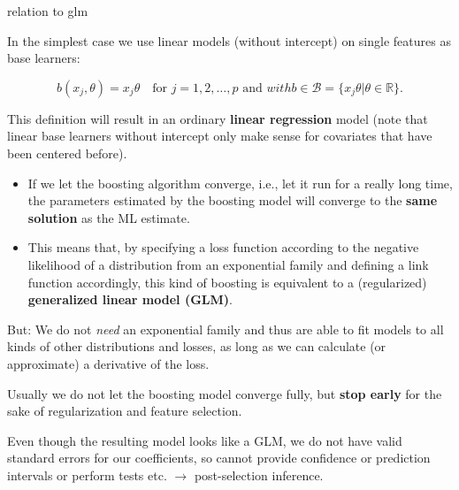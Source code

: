 
\begin{vbframe}{relation to glm}

In the simplest case we use linear models (without intercept) on single features 
as base learners:

$$
  b(x_j,\theta) = x_j \theta \quad \text{for } j = 1, 2, \dots, p \text{ and } with b \in \mathcal{B} = \{x_j \theta | \theta \in \mathbb{R} \}.
$$


This definition will result in an ordinary \textbf{linear regression} model 
(note that linear base learners without intercept only make sense for covariates 
that have been centered before).



\begin{itemize}
  \item If we let the boosting algorithm converge, i.e., let it run for a really 
  long time, the parameters estimated by the boosting model will converge to the 
  \textbf{same solution} as the ML estimate.
  \item This means that, by specifying a loss function according to the negative 
  likelihood of a distribution from an exponential family and defining a link 
  function accordingly, this kind of boosting is equivalent to a (regularized)
  \textbf{generalized linear model (GLM)}.
\end{itemize}

\framebreak


But: We do not \emph{need} an exponential family and thus are able to fit models 
to all kinds of other distributions and losses, as long as we can calculate (or 
approximate) a derivative of the loss. 

\lz

Usually we do not let the boosting model converge fully, but \textbf{stop 
early} for the sake of regularization and feature selection.

\lz

Even though the resulting model looks like a GLM, we do not have valid standard 
errors for our coefficients,
so cannot provide confidence or prediction intervals or perform tests etc.
$\rightarrow$ post-selection inference.

\end{vbframe}

